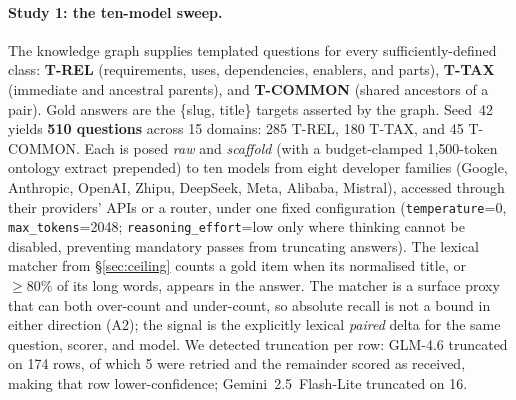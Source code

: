 \documentclass[10pt,twocolumn]{article}
\begin{document}
\paragraph{Study 1: the ten-model sweep.} The knowledge graph supplies templated questions for every sufficiently-defined class: \textbf{T-REL} (requirements, uses, dependencies, enablers, and parts), \textbf{T-TAX} (immediate and ancestral parents), and \textbf{T-COMMON} (shared ancestors of a pair). Gold answers are the \{slug, title\} targets asserted by the graph. Seed~42 yields \textbf{510 questions} across 15 domains: 285 T-REL, 180 T-TAX, and 45 T-COMMON. Each is posed \emph{raw} and \emph{scaffold} (with a budget-clamped 1{,}500-token ontology extract prepended) to ten models from eight developer families (Google, Anthropic, OpenAI, Zhipu, DeepSeek, Meta, Alibaba, Mistral), accessed through their providers' APIs or a router, under one fixed configuration (\texttt{temperature}=0, \texttt{max\_tokens}=2048; \texttt{reasoning\_effort}=low only where thinking cannot be disabled, preventing mandatory passes from truncating answers). The lexical matcher from \S\ref{sec:ceiling} counts a gold item when its normalised title, or $\geq80\%$ of its long words, appears in the answer. The matcher is a surface proxy that can both over-count and under-count, so absolute recall is not a bound in either direction (A2); the signal is the explicitly lexical \emph{paired} delta for the same question, scorer, and model. We detected truncation per row: GLM-4.6 truncated on 174 rows, of which 5 were retried and the remainder scored as received, making that row lower-confidence; Gemini~2.5~Flash-Lite truncated on 16.
\end{document}
